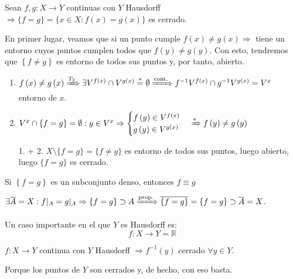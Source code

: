 \begin{prop}
Sean $f, g: X \rightarrow Y$ continuas con $Y$ Hausdorff $\Rightarrow \{f = g\} = \{x \in X : f\left( x \right) = g\left( x \right)\}$ es cerrado.
\end{prop}
\begin{demo}
En primer lugar, veamos que si un punto cumple $f\left( x \right) \neq g\left( x \right) \Rightarrow$ tiene un entorno cuyos puntos cumplen todos que $f\left( y \right) \neq g\left( y \right)$. Con esto, tendremos que $\left\{ f \neq g \right\}$ es entorno de todos sus puntos y, por tanto, abierto.
\begin{enumerate}
    \item $f\left( x \right) \neq g\left( x \right) \xRightarrow{T_2} \exists V^{f\left( x \right)} \cap V^{g\left( x \right)} \stackrel{*}{=} \emptyset \xRightarrow{\text{cont.}} f^{-1}V^{f\left( x \right)} \cap g^{-1}V^{g\left( x \right)} = V^x$ entorno de $x$.

    \item $V^x \cap \{f = g\} = \emptyset: y \in V^x \Rightarrow \begin{cases}
        f\left( y \right) \in V^{f\left( x \right)} \\
        g\left( y \right) \in V^{g\left( x \right)} 
    \end{cases} \xRightarrow{*} f\left( y \right) \neq g\left( y \right)$

    \item[1. + 2.] $X\setminus \{f = g\} = \{f \neq g\}$ es entorno de todos sus puntos, luego abierto, luego $\{f = g\}$ es cerrado.
\end{enumerate}
\end{demo}

\begin{coro}
Si $\left\{ f = g \right\}$ es un subconjunto denso, entonces $f \equiv g$
\end{coro}
\begin{demo}
$\exists \overline{A} = X: f|_A = g|_A \Rightarrow \{f = g\} \supset A \xRightarrow{\text{prop.}} \overline{\left\{ f = g \right\}} = \{f = g\} \supset \overline{A} = X$.
\end{demo}

\begin{ej}[Importante]
Un caso importante en el que $Y$ es Hausdorff es: 
\[
f: X \rightarrow Y = \mathbb{R}
\]
\end{ej}

\begin{obs}
$f: X \rightarrow Y$ continua con $Y$ Hausdorff $\Rightarrow f^{-1}\left( y \right)$ cerrado $\forall y \in Y$.
\begin{demo}
Porque los puntos de $Y$ son cerrados y, de hecho, con eso basta.
\end{demo}
\end{obs}

